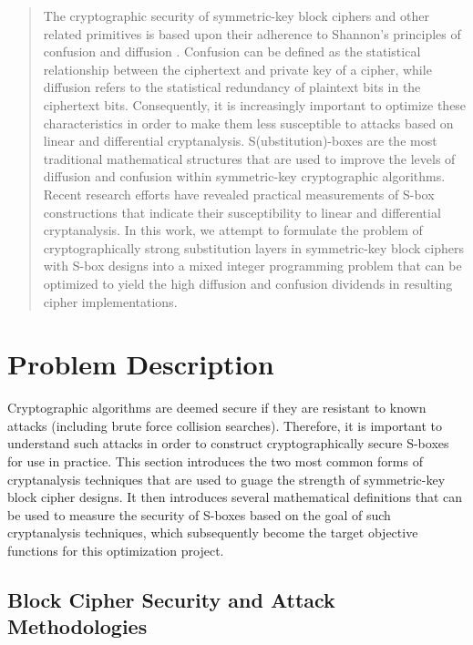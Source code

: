 \documentclass[11pt]{article}
\begin{document}

\begin{abstract}
The cryptographic security of symmetric-key block ciphers and other related primitives is based upon their adherence to Shannon's principles of confusion and diffusion \cite{Kim90astudy}. Confusion can be defined as the statistical relationship between the ciphertext and private key of a cipher, while diffusion refers to the statistical redundancy of plaintext bits in the ciphertext bits. Consequently, it is increasingly important to optimize these characteristics in order to make them less susceptible to attacks based on linear and differential cryptanalysis. S(ubstitution)-boxes are the most traditional mathematical structures that are used to improve the levels of diffusion and confusion within symmetric-key cryptographic algorithms. Recent research efforts have revealed practical measurements of S-box constructions that indicate their susceptibility to linear and differential cryptanalysis. In this work, we attempt to formulate the problem of cryptographically strong substitution layers in symmetric-key block ciphers with S-box designs into a mixed integer programming problem that can be optimized to yield the high diffusion and confusion dividends in resulting cipher implementations.
\end{abstract}

\section{Problem Description}
Cryptographic algorithms are deemed secure if they are resistant to known attacks (including brute force collision searches). Therefore, it is important to understand such attacks in order to construct cryptographically secure S-boxes for use in practice. This section introduces the two most common forms of cryptanalysis techniques that are used to guage the strength of symmetric-key block cipher designs. It then introduces several mathematical definitions that can be used to measure the security of S-boxes based on the goal of such cryptanalysis techniques, which subsequently become the target objective functions for this optimization project.

\subsection{Block Cipher Security and Attack Methodologies}
\end{document}
